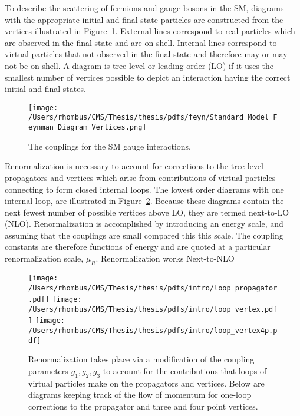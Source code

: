  To describe the scattering of fermions
  and gauge bosons in the SM,
  diagrams with the appropriate initial and final
  state particles are constructed from the 
  vertices illustrated in Figure~\ref{fig:smcouplings}.
 External lines correspond to real particles
  which are observed in the final state
  and are on-shell.
 Internal lines correspond to virtual
  particles that not observed in the 
  final state and therefore 
  may or may not be on-shell.
 A diagram is tree-level or leading order (LO) if it 
  uses the smallest number of vertices possible
  to depict an interaction having the
  correct initial and final states.

\begin{figure}[!htb]
 \center
 \caption[Illustrations of SM couplings]{
  The couplings for the SM gauge interactions.
 } 
 \texttt{[image: /Users/rhombus/CMS/Thesis/thesis/pdfs/feyn/Standard\_Model\_Feynman\_Diagram\_Vertices.png]}
    \label{fig:smcouplings}
\end{figure}

 Renormalization is necessary to account
  for corrections to the tree-level propagators
  and vertices which arise from contributions
  of virtual particles connecting to 
  form closed internal loops.
 The lowest order diagrams with
  one internal loop,
  are illustrated in Figure~\ref{fig:oneloopfeyn}.
 Because these diagrams contain the next fewest
  number of possible vertices above LO,
  they are termed next-to-LO (NLO).
 Renormalization is accomplished by introducing an energy scale,
  and assuming that the couplings are small compared 
  this this scale. 
 The coupling constants are therefore
  functions of energy 
  and are quoted at a particular renormalization scale,
  $\mu_R$.
 Renormalization works 
 Next-to-NLO 
 


\begin{figure}[!tb]
 \center
 \caption[One-loop corrections to vertices and propagator]{
  Renormalization takes place via a modification
   of the coupling parameters $g_1,g_2,g_3$ to account
   for the contributions that loops of virtual
   particles make on the propagators and vertices.
  Below are diagrams keeping track of the
   flow of momentum for one-loop corrections to the 
   propagator and three and four point vertices.
 } 
 \texttt{[image: /Users/rhombus/CMS/Thesis/thesis/pdfs/intro/loop\_propagator.pdf]}
 \texttt{[image: /Users/rhombus/CMS/Thesis/thesis/pdfs/intro/loop\_vertex.pdf]}
 \texttt{[image: /Users/rhombus/CMS/Thesis/thesis/pdfs/intro/loop\_vertex4p.pdf]}
    \label{fig:oneloopfeyn}
\end{figure}

